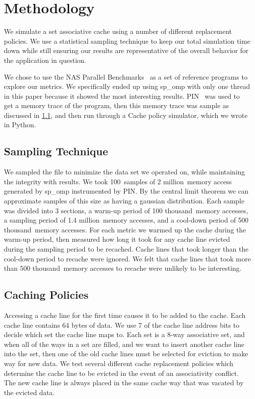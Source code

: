 \newcommand{\SAMPN}{100}
\newcommand{\SAMPK}{2 million}
\newcommand{\SAMP}{1.4 million}
\newcommand{\WARM}{100 thousand}
\newcommand{\COOL}{500 thousand}

\section{Methodology}
We simulate a set associative cache using a number of different
replacement policies.
We use a statistical sampling technique to keep our total simulation
time down while still ensuring our results are representative of the
overall behavior for the application in question.

We chose to use the NAS Parallel Benchmarks~\cite{bailey94} as a set of reference programs to explore our metrics.
We specifically ended up using sp\_omp with only one thread in this paper because it showed the most interesting results.
PIN~\cite{lukcohn05} was used to get a memory trace of the program,
 then this memory trace was sample as discussed in \ref{sec:sampling},
 and then run through a Cache policy simulator, which we wrote in Python.

\subsection{Sampling Technique}
\label{sec:sampling}
We sampled the file to minimize the data set we operated on, while maintaining the integrity with results.
	We took \SAMPN~samples of \SAMPK~memory access generated by sp\_omp instrumented by PIN.
	By the central limit theorem we can approximate samples of this size as having a gaussian distribution.
	Each sample was divided into 3 sections, a warm-up period of \WARM~memory accesses,
		a sampling period of \SAMP~memory accesses, and a cool-down period of \COOL~memory accesses.
	For each metric we warmed up the cache during the warm-up period,
		then measured how long it took for any cache line evicted during the sampling period to be recached.
	Cache lines that took longer than the cool-down period to recache were ignored.
	We felt that cache lines that took more than \COOL~memory accesses to recache were unlikely to be interesting.

\subsection{Caching Policies}
\label{sec:policies}

Accessing a cache line for the first time causes it to be added to the cache.
Each cache line contains 64 bytes of data.
We use 7 of the cache line address bits to decide which set the cache line maps to.
Each set is a 8-way associative set, and when all of the ways in a set are filled,
 and we want to insert another cache line into the set, then one of the old cache lines must be selected for eviction to make way for new data.
We test several different cache replacement policies which determine the cache line to be evicted in the event of an associativity conflict.
The new cache line is always placed in the same cache way that was vacated by the evicted data.

